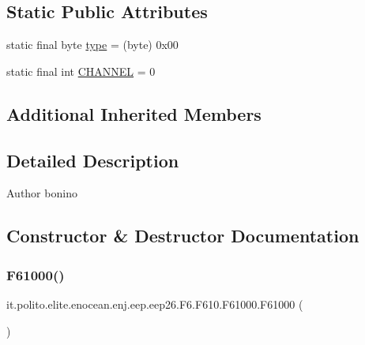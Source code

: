 \subsection*{Static Public Attributes}
\begin{DoxyCompactItemize}
\item 
static final byte \hyperlink{classit_1_1polito_1_1elite_1_1enocean_1_1enj_1_1eep_1_1eep26_1_1_f6_1_1_f610_1_1_f61000_a11e1826df8ee91b964ea89b95c5b37f0}{type} = (byte) 0x00
\item 
static final int \hyperlink{classit_1_1polito_1_1elite_1_1enocean_1_1enj_1_1eep_1_1eep26_1_1_f6_1_1_f610_1_1_f61000_a3d5ee9532f23a1edda0fef17ab394f12}{C\+H\+A\+N\+N\+EL} = 0
\end{DoxyCompactItemize}
\subsection*{Additional Inherited Members}


\subsection{Detailed Description}
\begin{DoxyAuthor}{Author}
bonino 
\end{DoxyAuthor}


\subsection{Constructor \& Destructor Documentation}
\hypertarget{classit_1_1polito_1_1elite_1_1enocean_1_1enj_1_1eep_1_1eep26_1_1_f6_1_1_f610_1_1_f61000_a72084a4e522dcb431237079669f9ab6e}{}\label{classit_1_1polito_1_1elite_1_1enocean_1_1enj_1_1eep_1_1eep26_1_1_f6_1_1_f610_1_1_f61000_a72084a4e522dcb431237079669f9ab6e} 
\subsubsection{\texorpdfstring{F61000()}{F61000()}}
{\footnotesize\ttfamily it.\+polito.\+elite.\+enocean.\+enj.\+eep.\+eep26.\+F6.\+F610.\+F61000.\+F61000 (\begin{DoxyParamCaption}{ }\end{DoxyParamCaption})}



